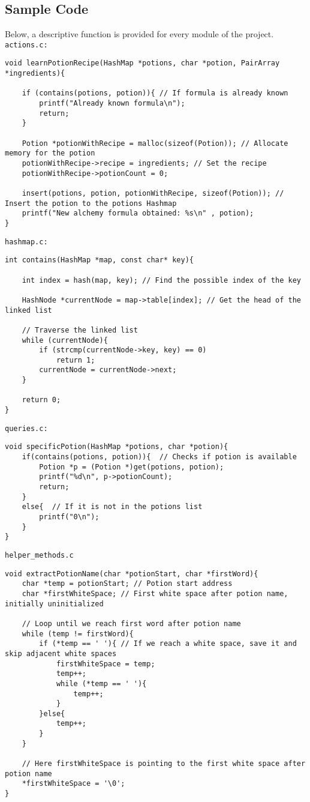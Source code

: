 \documentclass[a4paper,12pt]{article}
\begin{document}
\subsection{Sample Code}
Below, a descriptive function is provided for every module of the project.\newline\newline
\texttt{actions.c:}
\begin{lstlisting}[style=CStyle]
void learnPotionRecipe(HashMap *potions, char *potion, PairArray *ingredients){

    if (contains(potions, potion)){ // If formula is already known
        printf("Already known formula\n");
        return;
    }

    Potion *potionWithRecipe = malloc(sizeof(Potion)); // Allocate memory for the potion
    potionWithRecipe->recipe = ingredients; // Set the recipe
    potionWithRecipe->potionCount = 0;

    insert(potions, potion, potionWithRecipe, sizeof(Potion)); // Insert the potion to the potions Hashmap
    printf("New alchemy formula obtained: %s\n" , potion);
}
\end{lstlisting}
\texttt{hashmap.c:}
\begin{lstlisting}[style=CStyle]
int contains(HashMap *map, const char* key){

    int index = hash(map, key); // Find the possible index of the key

    HashNode *currentNode = map->table[index]; // Get the head of the linked list

    // Traverse the linked list
    while (currentNode){
        if (strcmp(currentNode->key, key) == 0)
            return 1;
        currentNode = currentNode->next;
    }

    return 0;
}
\end{lstlisting}
\texttt{queries.c:}
\begin{lstlisting}[style=CStyle]
void specificPotion(HashMap *potions, char *potion){
    if(contains(potions, potion)){  // Checks if potion is available
        Potion *p = (Potion *)get(potions, potion);
        printf("%d\n", p->potionCount);
        return;
    }
    else{  // If it is not in the potions list
        printf("0\n");
    }
}
\end{lstlisting}
\texttt{helper\_methods.c}
\begin{lstlisting}[style=CStyle]
void extractPotionName(char *potionStart, char *firstWord){
    char *temp = potionStart; // Potion start address
    char *firstWhiteSpace; // First white space after potion name, initially uninitialized

    // Loop until we reach first word after potion name
    while (temp != firstWord){
        if (*temp == ' '){ // If we reach a white space, save it and skip adjacent white spaces
            firstWhiteSpace = temp;
            temp++;
            while (*temp == ' '){
                temp++;
            }
        }else{
            temp++;
        }
    }

    // Here firstWhiteSpace is pointing to the first white space after potion name
    *firstWhiteSpace = '\0';
}
\end{lstlisting}
\end{document}
